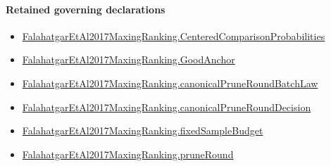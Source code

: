 \documentclass[10pt]{article}
\begin{document}
\paragraph{Retained governing declarations}
\begin{itemize}\raggedright
\item \hyperlink{paper-prerequisite-b99b697ef57f53ce}{Falahatgar\allowbreak{}Et\allowbreak{}Al2017\allowbreak{}Maxing\allowbreak{}Ranking.\allowbreak{}Centered\allowbreak{}Comparison\allowbreak{}Probabilities}
\item \hyperlink{paper-prerequisite-46128be8e1edb4b6}{Falahatgar\allowbreak{}Et\allowbreak{}Al2017\allowbreak{}Maxing\allowbreak{}Ranking.\allowbreak{}Good\allowbreak{}Anchor}
\item \hyperlink{governing-declaration-05a85474e37a92ba}{Falahatgar\allowbreak{}Et\allowbreak{}Al2017\allowbreak{}Maxing\allowbreak{}Ranking.\allowbreak{}canonical\allowbreak{}Prune\allowbreak{}Round\allowbreak{}Batch\allowbreak{}Law}
\item \hyperlink{governing-declaration-a417c9a89763d710}{Falahatgar\allowbreak{}Et\allowbreak{}Al2017\allowbreak{}Maxing\allowbreak{}Ranking.\allowbreak{}canonical\allowbreak{}Prune\allowbreak{}Round\allowbreak{}Decision}
\item \hyperlink{governing-declaration-4b4daf4bb2493573}{Falahatgar\allowbreak{}Et\allowbreak{}Al2017\allowbreak{}Maxing\allowbreak{}Ranking.\allowbreak{}fixed\allowbreak{}Sample\allowbreak{}Budget}
\item \hyperlink{governing-declaration-d3d8824237f88f4d}{Falahatgar\allowbreak{}Et\allowbreak{}Al2017\allowbreak{}Maxing\allowbreak{}Ranking.\allowbreak{}prune\allowbreak{}Round}
\end{itemize}
\end{document}
